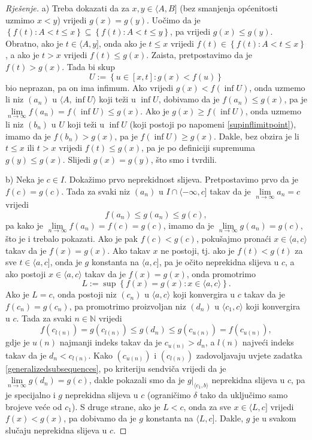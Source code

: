 \begin{proof}[Rješenje]
a) Treba dokazati da za $x, y\in \langle A, B]$ (bez smanjenja općenitosti uzmimo $x<y$) vrijedi $g(x)=g(y)$. Uočimo da je $\left\{f(t) : A<t\leq x\right\}\subseteq \left\{f(t) : A<t\leq y\right\}$, pa vrijedi $g(x)\leq g(y)$. Obratno, ako je $t\in \langle A, y]$, onda ako je $t\leq x$ vrijedi $f(t)\in \left\{f(t) : A<t\leq x\right\}$, a ako je $t>x$ vrijedi $f(t)\leq g(x)$. Zaista, pretpostavimo da je $f(t)>g(x)$. Tada bi skup 
$$U:=\left\{u\in [x, t] : g(x)<f(u)\right\}$$
bio neprazan, pa on ima infimum. Ako vrijedi $g(x)<f(\inf{U})$, onda uzmemo li niz $(a_n)$ u $\langle A, \inf{U}\rangle$ koji teži u $\inf{U}$, dobivamo da je $f(a_n)\leq g(x)$, pa je $\lim\limits_{n\to \infty}{f(a_n)}=f(\inf{U})\leq g(x)$. Ako je $g(x)\geq f(\inf{U})$, onda uzmemo li niz $(b_n)$ u $U$ koji teži u $\inf{U}$ (koji postoji po napomeni \ref{supinflimitpoint}), imamo da je $f(b_n)>g(x)$, pa je $f(\inf{U})\geq g(x)$. Dakle, bez obzira je li $t\leq x$ ili $t>x$ vrijedi $f(t)\leq g(x)$, pa je po definiciji supremuma $g(y)\leq g(x)$. Slijedi $g(x)=g(y)$, što smo i tvrdili.

b) Neka je $c\in I$. Dokažimo prvo neprekidnost slijeva. Pretpostavimo prvo da je $f(c)=g(c)$. Tada za svaki niz $(a_n)$ u $I\cap \langle -\infty, c]$ takav da je $\lim\limits_{n\to \infty}{a_n}=c$ vrijedi
$$f(a_n)\leq g(a_n)\leq g(c),$$
pa kako je $\lim\limits_{n\to \infty}{f(a_n)}=f(c)=g(c)$, imamo da je $\lim\limits_{n\to \infty}{g(a_n)}=g(c)$, što je i trebalo pokazati.
Ako je pak $f(c)<g(c)$, pokušajmo pronaći $x\in \langle a, c\rangle$ takav da je $f(x)=g(x)$. Ako takav $x$ ne postoji, tj. ako je $f(t)<g(t)$ za sve $t\in \langle a, c]$, onda je $g$ konstanta na $\langle a, c]$, pa je očito neprekidna slijeva u $c$, a ako postoji $x\in \langle a, c\rangle$ takav da je $f(x)=g(x)$, onda promotrimo 
$$L:=\sup\left\{f(x)=g(x) : x\in \langle a, c\rangle\right\}.$$
Ako je $L=c$, onda postoji niz $(c_n)$ u $\langle a, c\rangle$ koji konvergira u $c$ takav da je $f(c_n)=g(c_n)$, pa promotrimo proizvoljan niz $(d_n)$ u $\langle c_1, c\rangle$ koji konvergira u $c$. Tada za svaki $n\in \mathbb{N}$ vrijedi
$$f(c_{l(n)})=g(c_{l(n)})\leq g(d_n)\leq g(c_{u(n)})=f(c_{u(n)}),$$
gdje je $u(n)$ najmanji indeks takav da je $c_{u(n)}>d_n$, a $l(n)$ najveći indeks takav da je $d_n<c_{l(n)}$. Kako $(c_{u(n)})$ i $(c_{l(n)})$ zadovoljavaju uvjete zadatka \ref{generalizedsubsequences}, po kriteriju sendviča vrijedi da je $\lim\limits_{n\to \infty}{g(d_n)}=g(c)$, dakle pokazali smo da je $g|_{\langle c_1, b\rangle}$ neprekidna slijeva u $c$, pa je specijalno i $g$ neprekidna slijeva u $c$ (ograničimo $\delta$ tako da uključimo samo brojeve veće od $c_1$). S druge strane, ako je $L<c$, onda za sve $x\in \langle L, c]$ vrijedi $f(x)<g(x)$, pa dobivamo da je $g$ konstanta na $\langle L, c]$. Dakle, $g$ je u svakom slučaju neprekidna slijeva u $c$.


\end{proof}
